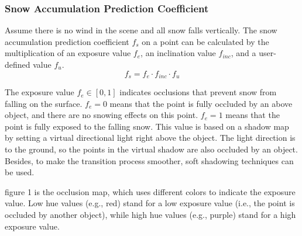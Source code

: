 \documentclass{article}
\begin{document}
\subsubsection {Snow Accumulation Prediction Coefficient}
Assume there is no wind in the scene and all snow falls vertically. The snow accumulation prediction coefficient \( f_{s} \) on a 
point can be calculated by the multiplication of an exposure value \( f_{e} \), an inclination value \( f_{inc} \), and a user-defined 
value \( f_{u} \).
\[
  f_{s} = f_{e} \cdot f_{inc} \cdot f_{u}
\]

The exposure value \( f_{e} \in [0, 1] \) indicates occlusions that prevent snow from falling on the surface. \( f_{e}=0 \) means that 
the point is fully occluded by an above object, and there are no snowing effects on this point. \( f_{e}=1 \) means that the point is 
fully exposed to the falling snow. This value is based on a shadow map by setting a virtual directional light right above the object. 
The light direction is to the ground, so the points in the virtual shadow are also occluded by an object. Besides, to make the 
transition process smoother, soft shadowing techniques can be used. 

figure 1 is the occlusion map, which uses different colors to indicate the exposure value. Low hue 
values (e.g., red) stand for a low exposure value (i.e., the point is occluded by another object), while high hue 
values (e.g., purple) stand for a high exposure value.
\end{document}
